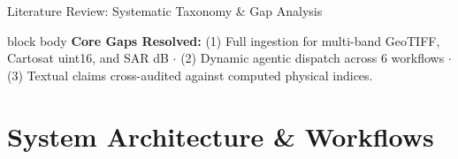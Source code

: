 \documentclass[aspectratio=169, 10pt]{beamer}
\begin{document}
\begin{frame}{Literature Review: Systematic Taxonomy \& Gap Analysis}
  \vspace{0.1em}
  \begin{beamercolorbox}[wd=\textwidth, rounded=true, shadow=false, leftskip=2ex, rightskip=2ex]{block body}
    \scriptsize\vspace{0.15em}
    \textbf{\color{IEEEDarkBlue}Core Gaps Resolved:} (1) Full ingestion for multi-band GeoTIFF, Cartosat uint16, and SAR dB $\cdot$ (2) Dynamic agentic dispatch across 6 workflows $\cdot$ (3) Textual claims cross-audited against computed physical indices.\vspace{0.15em}
  \end{beamercolorbox}
\end{frame}

\section{System Architecture \& Workflows}
\end{document}
